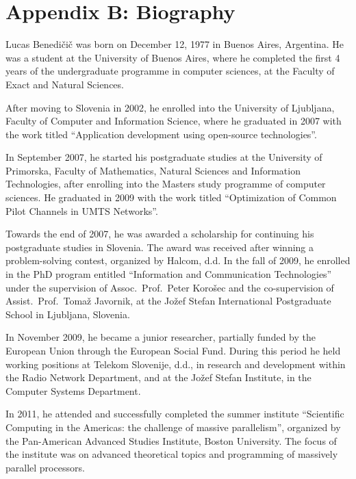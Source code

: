 
\chapter*{{\Large{\vspace{-2.3cm}Appendix B: Biography}}}

\noindent {}
\fancyhead[LO]{}

\noindent %

\noindent Lucas Benedi\v{c}i\v{c} was born on December 12, 1977 in
Buenos Aires, Argentina. He was a student at the University of Buenos
Aires, where he completed the first 4 years of the undergraduate programme
in computer sciences, at the Faculty of Exact and Natural Sciences.

After moving to Slovenia in 2002, he enrolled into the University
of Ljubljana, Faculty of Computer and Information Science, where he
graduated in 2007 with the work titled ``Application development
using open-source technologies''.

In September 2007, he started his postgraduate studies at the University
of Primorska, Faculty of Mathematics, Natural Sciences and Information
Technologies, after enrolling into the Masters study programme of
computer sciences. He graduated in 2009 with the work titled ``Optimization
of Common Pilot Channels in UMTS Networks''.

Towards the end of 2007, he was awarded a scholarship for continuing
his postgraduate studies in Slovenia. The award was received after
winning a problem-solving contest, organized by Halcom, d.d. In the
fall of 2009, he enrolled in the PhD program entitled ``Information
and Communication Technologies'' under the supervision of Assoc.~Prof.~Peter
Koro\v{s}ec and the co-supervision of Assist.~Prof.~Toma\v{z}
Javornik, at the Jo\v{z}ef Stefan International Postgraduate School
in Ljubljana, Slovenia.

In November 2009, he became a junior researcher, partially funded
by the European Union through the European Social Fund. During this
period he held working positions at Telekom Slovenije, d.d., in research
and development within the Radio Network Department, and at the Jo\v{z}ef
Stefan Institute, in the Computer Systems Department.

In 2011, he attended and successfully completed the summer institute
``Scientific Computing in the Americas: the challenge of massive
parallelism'', organized by the Pan-American Advanced Studies Institute,
Boston University. The focus of the institute was on advanced theoretical
topics and programming of massively parallel processors.

